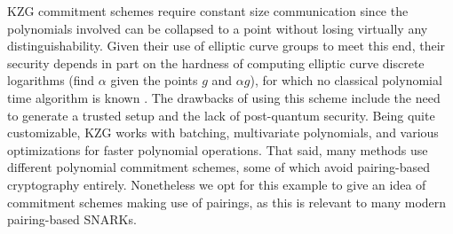 \noindent KZG commitment schemes require constant size communication since the polynomials involved can be collapsed to a point without losing virtually any distinguishability. Given their use of elliptic curve groups to meet this end, their security depends in part on the hardness of computing elliptic curve discrete logarithms (find $\alpha$ given the points $g$ and $\alpha g$), for which no classical polynomial time algorithm is known \cite{ecdlp}. The drawbacks of using this scheme include the need to generate a trusted setup and the lack of post-quantum security. Being quite customizable, KZG works with batching, multivariate polynomials, and various optimizations for faster polynomial operations. That said, many methods use different polynomial commitment schemes, some of which avoid pairing-based cryptography entirely. Nonetheless we opt for this example to give an idea of commitment schemes making use of pairings, as this is relevant to many modern pairing-based SNARKs.
